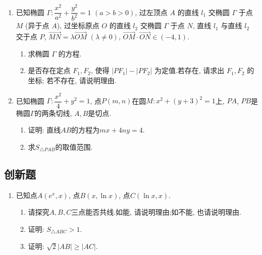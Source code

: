 \documentclass[12pt, a4paper, oneside]{ctexart}
\begin{document}
\begin{enumerate}[leftmargin=*]
    \item 已知椭圆 $\varGamma : \dfrac{x^2}{a^2} + \dfrac{y^2}{b^2} = 1$ $(a > b > 0)$, 过左顶点 $A$ 的直线 $l_1$ 交椭圆 $\varGamma$ 于点 $M$ (异于点 $A$), 过坐标原点 $O$ 的直线 $l_2$ 交椭圆 $\varGamma$ 于点 $N$, 直线 $l_1$ 与直线 $l_2$ 交于点 $P$, $\overrightarrow{MN} = \lambda \overrightarrow{OM}$ $(\lambda \neq 0)$, $\overrightarrow{OM} \cdot \overrightarrow{ON} \in (-4 , 1)$.
          \begin{enumerate}
              \item 求椭圆 $\varGamma$ 的方程.
              \item 是否存在定点 $F_1, F_2$, 使得 $\left\lvert PF_1 \right\rvert - \left\lvert PF_2 \right\rvert$ 为定值.若存在, 请求出 $F_1, F_2$ 的坐标; 若不存在, 请说明理由.
          \end{enumerate}
          \vspace*{2\baselineskip}
    \item 已知椭圆 $\varGamma : \dfrac{x^2}{4} + y^2 = 1$, 点$P\left(m, n\right)$在圆$M: x^2+\left(y+3\right)^2=1$上, $PA$, $PB$是椭圆$\varGamma$的两条切线, $A, B$是切点.
    \begin{enumerate}
        \item 证明: 直线$AB$的方程为$mx+4ny=4$.
        \item 求$S_{\triangle PAB}$的取值范围.
    \end{enumerate}
\end{enumerate}

\subsection{创新题}

\begin{enumerate}[leftmargin=*]
    \item 已知点$A\left(e^x, x\right)$, 点$B\left(x, \ln x\right)$, 点$C\left(\ln x,x\right)$.
          \begin{enumerate}
              \item 请探究$A,B,C$三点能否共线.如能, 请说明理由;如不能, 也请说明理由.
              \item 证明: $S_{\triangle ABC}>1$.
              \item 证明: $\sqrt{2}\left\lvert AB\right\rvert \geq \left\lvert AC\right\rvert  $.
          \end{enumerate}
\end{enumerate}
\end{document}

